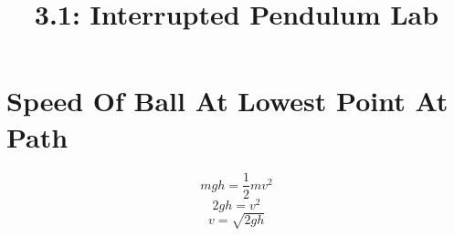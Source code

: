 \documentclass{article}
\title{3.1: Interrupted Pendulum Lab}
\begin{document}
\section{Speed Of Ball At Lowest Point At Path}
\[mgh = \frac{1}{2}mv^2\]
\[2gh = v^2\]
\[v = \sqrt{2gh}\]
\end{document}
